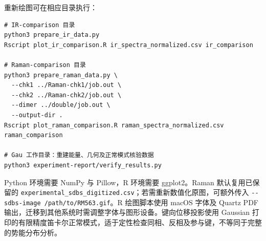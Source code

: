 \documentclass[a4paper,12pt]{article}
\begin{document}
重新绘图可在相应目录执行：

\noindent\begin{minipage}{\textwidth}
\begin{lstlisting}[style=bashStyle]
# IR-comparison 目录
python3 prepare_ir_data.py
Rscript plot_ir_comparison.R ir_spectra_normalized.csv ir_comparison

# Raman-comparison 目录
python3 prepare_raman_data.py \
  --chk1 ../Raman-chk1/job.out \
  --chk2 ../Raman-chk2/job.out \
  --dimer ../double/job.out \
  --output-dir .
Rscript plot_raman_comparison.R raman_spectra_normalized.csv raman_comparison

# Gau 工作目录：重建能量、几何及正常模式核验数据
python3 experiment-report/verify_results.py
\end{lstlisting}
\end{minipage}

Python 环境需要 NumPy 与 Pillow，R 环境需要 ggplot2。Raman 默认复用已保留的 \nolinkurl{experimental_sdbs_digitized.csv}；若需重新数值化原图，可额外传入 \nolinkurl{--sdbs-image /path/to/RM563.gif}。R 绘图脚本使用 macOS 字体及 Quartz PDF 输出，迁移到其他系统时需调整字体与图形设备。键向位移投影使用 Gaussian 打印的有限精度笛卡尔正常模式，适于定性检查同相、反相及参与键，不等同于完整的势能分布分析。
\end{document}
